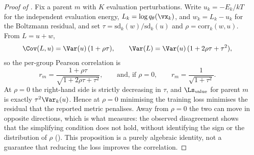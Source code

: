 \begin{proof}[Proof of ]
Fix a parent $m$ with $K$ evaluation perturbations. Write $u_k = -E_k/kT$ for the
independent evaluation energy, $L_k = \log q_\theta(\vx_k)$, and
$w_k = L_k - u_k$ for the Boltzmann residual, and set
$\tau = \mathrm{sd}_k(w)/\mathrm{sd}_k(u)$ and $\rho = \mathrm{corr}_k(w,u)$.
From $L = u + w$,
\begin{equation}
  \Cov(L,u) = \Var(u)\,(1+\rho\tau),
  \qquad
  \Var(L) = \Var(u)\,(1 + 2\rho\tau + \tau^2),
\end{equation}
so the per-group Pearson correlation is
\begin{equation}
  r_m = \frac{1+\rho\tau}{\sqrt{1+2\rho\tau+\tau^2}},
  \qquad\text{and, if } \rho = 0, \qquad
  r_m = \frac{1}{\sqrt{1+\tau^2}} .
  \label{eq:app-surrogate}
\end{equation}
At $\rho = 0$ the right-hand side is strictly decreasing in $\tau$, and
$\Ls_{\mathrm{value}}$ for parent $m$ is exactly $\tau^2\Var_k(u)$. Hence at
$\rho = 0$ minimising the training loss minimises the residual that the reported
metric penalises. Away from $\rho = 0$ the two can move in opposite directions,
which is what  measures: the observed disagreement shows that the
simplifying condition does not hold, without identifying the sign or the
distribution of $\rho$ (). This proposition is a purely algebraic
identity, not a guarantee that reducing the loss improves the correlation.
\end{proof}

